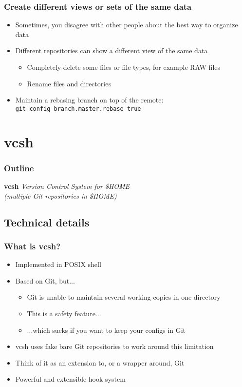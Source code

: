 \documentclass[t]{beamer}
\begin{document}
\begin{frame}
	\frametitle{Create different views or sets of the same data}
	\begin{itemize}
		\item Sometimes, you disagree with other people about the best way to organize data
		\item Different repositories can show a different view of the same data
			\begin{itemize}
				\item Completely delete some files or file types, for example RAW files
				\item Rename files and directories
			\end{itemize}
		\item Maintain a rebasing branch on top of the remote: \\
			\texttt{git config branch.master.rebase true}
	\end{itemize}
\end{frame}


\section{vcsh}

\begin{frame}
	\frametitle{Outline}
	\tableofcontents[currentsection]
\end{frame}

\begin{frame}
		\begin{center}
			\vfill
			\vfill
			\textbf{vcsh}
			\vfill
			\textit{Version Control System for \$HOME \\ (multiple Git repositories in \$HOME)}
			\vfill
			\vfill
		\end{center}
\end{frame}

\subsection{Technical details}

\begin{frame}
	\frametitle{What is vcsh?}
	\begin{itemize}
		\item Implemented in POSIX shell
		\item Based on Git, but...
		\begin{itemize}
			\item Git is unable to maintain several working copies in one directory
			\item This is a safety feature...
			\item ...which sucks if you want to keep your configs in Git
		\end{itemize}
		\item vcsh uses fake bare Git repositories to work around this limitation
		\item Think of it as an extension to, or a wrapper around, Git
		\item Powerful and extensible hook system
	\end{itemize}
\end{frame}
\end{document}
